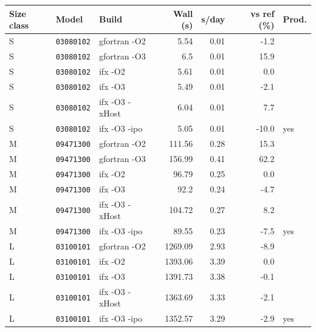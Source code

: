 \begin{tabular*}{\textwidth}{@{\extracolsep{\fill}}lllrrrl@{}}
\toprule
Size class & Model & Build & Wall (s) & s/day & vs ref (\%) & Prod. \\
\midrule
S & \texttt{03080102} & gfortran -O2 & 5.54 & 0.01 & -1.2 &  \\
S & \texttt{03080102} & gfortran -O3 & 6.5 & 0.01 & 15.9 &  \\
S & \texttt{03080102} & ifx -O2 & 5.61 & 0.01 & 0.0 &  \\
S & \texttt{03080102} & ifx -O3 & 5.49 & 0.01 & -2.1 &  \\
S & \texttt{03080102} & ifx -O3 -xHost & 6.04 & 0.01 & 7.7 &  \\
S & \texttt{03080102} & ifx -O3 -ipo & 5.05 & 0.01 & -10.0 & yes \\
M & \texttt{09471300} & gfortran -O2 & 111.56 & 0.28 & 15.3 &  \\
M & \texttt{09471300} & gfortran -O3 & 156.99 & 0.41 & 62.2 &  \\
M & \texttt{09471300} & ifx -O2 & 96.79 & 0.25 & 0.0 &  \\
M & \texttt{09471300} & ifx -O3 & 92.2 & 0.24 & -4.7 &  \\
M & \texttt{09471300} & ifx -O3 -xHost & 104.72 & 0.27 & 8.2 &  \\
M & \texttt{09471300} & ifx -O3 -ipo & 89.55 & 0.23 & -7.5 & yes \\
L & \texttt{03100101} & gfortran -O2 & 1269.09 & 2.93 & -8.9 &  \\
L & \texttt{03100101} & ifx -O2 & 1393.06 & 3.39 & 0.0 &  \\
L & \texttt{03100101} & ifx -O3 & 1391.73 & 3.38 & -0.1 &  \\
L & \texttt{03100101} & ifx -O3 -xHost & 1363.69 & 3.33 & -2.1 &  \\
L & \texttt{03100101} & ifx -O3 -ipo & 1352.57 & 3.29 & -2.9 & yes \\
\bottomrule
\end{tabular*}
